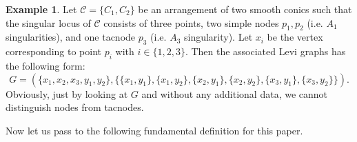 \documentclass[12pt]{article}
\theoremstyle{plain}
\theoremstyle{definition}
\newtheorem{example}[thm]{Example}
\begin{document}
\begin{example}
Let $\mathcal{C} = \{C_{1}, C_{2}\}$ be an arrangement of two smooth conics such that the singular locus of $\mathcal{C}$ consists of three points, two simple nodes $p_{1},p_{2}$ (i.e. $A_{1}$ singularities), and one tacnode $p_{3}$ (i.e. $A_{3}$ singularity). Let $x_{i}$ be the vertex corresponding to point $p_{i}$ with $i \in \{1,2,3\}$. Then the associated Levi graphs has the following form:
$$G=(\{x_{1},x_{2},x_{3}, y_{1}, y_{2}\}, \{\{x_{1},y_{1}\}, \{x_{1},y_{2}\},\{x_{2},y_{1}\},\{x_{2},y_{2}\},\{x_{3},y_{1}\}, \{x_{3},y_{2}\}\}).$$
Obviously, just by looking at $G$ and without any additional data, we cannot distinguish nodes from tacnodes.
\end{example}
Now let us pass to the following fundamental definition for this paper.
\end{document}
